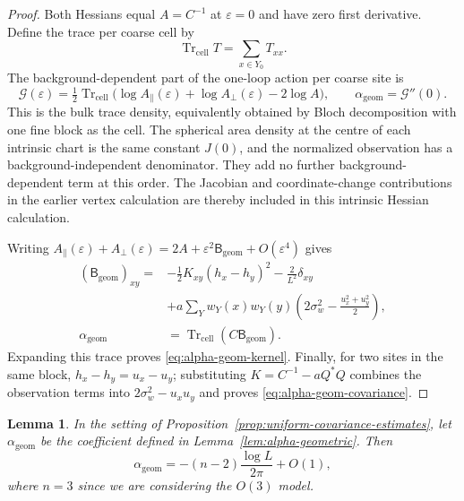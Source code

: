 \documentclass[11pt]{article}
\newcommand{\tr}{\operatorname{Tr}}
\numberwithin{equation}{section}
\newtheorem{lemma}[theorem]{Lemma}
\theoremstyle{definition}
\theoremstyle{plain}
\begin{document}
\begin{proof}
Both Hessians equal $A=C^{-1}$ at $\varepsilon=0$ and have zero
first derivative.  Define the trace per coarse cell by
\begin{equation}
 \tr_{\mathrm{cell}} T=\sum_{x\in Y_0}T_{xx}.
\end{equation}
The background-dependent part of the one-loop action per coarse
site is
\begin{equation}
 \mathcal G(\varepsilon)
 =\tfrac12\tr_{\mathrm{cell}}
       \bigl(\log A_\parallel(\varepsilon)
             +\log A_\perp(\varepsilon)-2\log A\bigr),
 \qquad
 \alpha_{\mathrm{geom}}=\mathcal G''(0).
 \label{eq:geom-logdet}
\end{equation}
This is the bulk trace density, equivalently obtained by Bloch
decomposition with one fine block as the cell.  The spherical
area density at the centre of each intrinsic chart is the same
constant $J(0)$, and the normalized observation has a
background-independent denominator.  They add no further
background-dependent term at this order.  The Jacobian and
coordinate-change contributions in the earlier vertex calculation
are thereby included in this intrinsic Hessian calculation.

Writing
$A_\parallel(\varepsilon)+A_\perp(\varepsilon)
 =2A+\varepsilon^2\mathsf B_{\mathrm{geom}}+O(\varepsilon^4)$ gives
\begin{align}
 (\mathsf B_{\mathrm{geom}})_{xy}
 ={}&-\tfrac12K_{xy}(h_x-h_y)^2
       -\frac{2}{L^2}\delta_{xy}\nonumber\\
 &+a\sum_Y w_Y(x)w_Y(y)
       \left(2\sigma_w^2-\frac{u_x^2+u_y^2}{2}\right),\\
 \alpha_{\mathrm{geom}}&=\tr_{\mathrm{cell}}(C\mathsf B_{\mathrm{geom}}).
\end{align}
Expanding this trace proves \eqref{eq:alpha-geom-kernel}.
Finally, for two sites in the same block,
$h_x-h_y=u_x-u_y$; substituting
$K=C^{-1}-aQ^*Q$ combines the observation terms into
$2\sigma_w^2-u_xu_y$ and proves
\eqref{eq:alpha-geom-covariance}.
\end{proof}




\begin{lemma}
\label{lem:geom-leading-log}
In the setting of Proposition~\ref{prop:uniform-covariance-estimates},
let $\alpha_{\mathrm{geom}}$ be the coefficient defined in
Lemma~\ref{lem:alpha-geometric}.
Then
\begin{equation}
 \alpha_{\mathrm{geom}}
   =-(n-2)\frac{\log L}{2\pi}+O(1),
 \label{eq:geom-leading-log}
\end{equation}
where $n=3$ since we are considering the $O(3)$ model.
\end{lemma}
\end{document}
